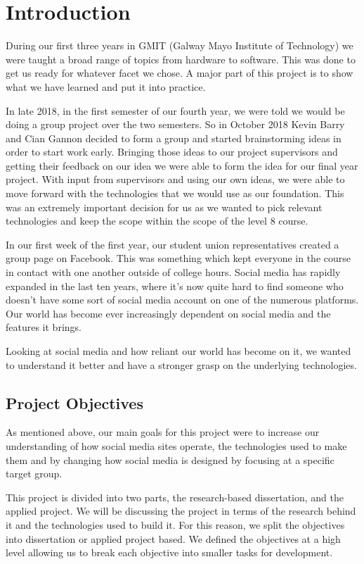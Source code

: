 \chapter{Introduction}
During our first three years in GMIT (Galway Mayo Institute of Technology) we were taught a broad range of topics from hardware to software. This was done to get us ready for whatever facet we chose. A major part of this project is to show what we have learned and put it into practice.

In late 2018, in the first semester of our fourth year, we were told we would be doing a group project over the two semesters. So in October 2018 Kevin Barry and Cian Gannon decided to form a group and started brainstorming ideas in order to start work early. Bringing those ideas to our project supervisors and getting their feedback on our idea we were able to form the idea for our final year project. With input from supervisors and using our own ideas, we were able to move forward with the technologies that we would use as our foundation. This was an extremely important decision for us as we wanted to pick relevant technologies and keep the scope within the scope of the level 8 course. 

In our first week of the first year, our student union representatives created a group page on Facebook. This was something which kept everyone in the course in contact with one another outside of college hours. Social media has rapidly expanded in the last ten years, where it's now quite hard to find someone who doesn't have some sort of social media account on one of the numerous platforms. Our world has become ever increasingly dependent on social media and the features it brings.

Looking at social media and how reliant our world has become on it, we wanted to understand it better and have a stronger grasp on the underlying technologies.

\section{Project Objectives} \label{objectives}
As mentioned above, our main goals for this project were to increase our understanding of how social media sites operate, the technologies used to make them and by changing how social media is designed by focusing at a specific target group.

This project is divided into two parts, the research-based dissertation, and the applied project. We will be discussing the project in terms of the research behind it and the technologies used to build it. For this reason, we split the objectives into dissertation or applied project based. We defined the objectives at a high level allowing us to break each objective into smaller tasks for development.

